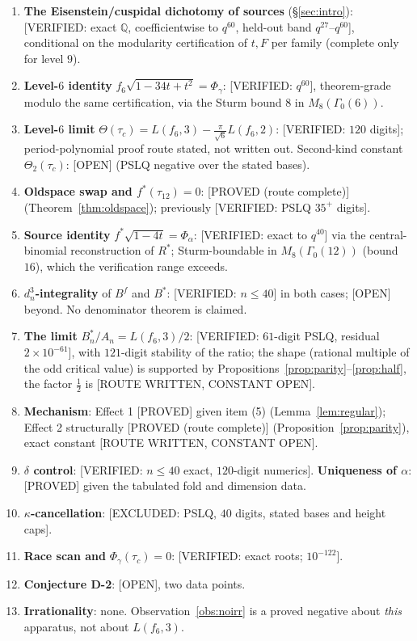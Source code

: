 \documentclass[11pt,reqno]{amsart}
\theoremstyle{plain}
\theoremstyle{definition}
\theoremstyle{remark}
\newcommand{\Q}{\mathbb{Q}}
\newcommand{\fs}{f^{*}}
\newcommand{\Proved}{\textup{\textsf{[PROVED]}}}
\newcommand{\ProvedS}{\textup{\textsf{[PROVED (route complete)]}}}
\newcommand{\VerifiedR}[1]{\textup{\textsf{[VERIFIED: #1]}}}
\newcommand{\ExcludedR}[1]{\textup{\textsf{[EXCLUDED: #1]}}}
\newcommand{\Open}{\textup{\textsf{[OPEN]}}}
\newcommand{\RouteOpen}{\textup{\textsf{[ROUTE WRITTEN, CONSTANT OPEN]}}}
\begin{document}
\begin{enumerate}[leftmargin=2.4em,label=(\arabic*)]
\item \textbf{The Eisenstein/cuspidal dichotomy of sources}
(\S\ref{sec:intro}): \VerifiedR{exact $\Q$, coefficientwise to $q^{60}$,
held-out band $q^{27}$--$q^{60}$}, conditional on the modularity
certification of $t,F$ per family (complete only for level $9$).
\item \textbf{Level-$6$ identity} $f_6\sqrt{1-34t+t^2}=\Phi_\gamma$:
\VerifiedR{$q^{60}$}, theorem-grade modulo the same certification, via the
Sturm bound $8$ in $M_8(\Gamma_0(6))$.
\item \textbf{Level-$6$ limit} $\Theta(\tau_c)=L(f_6,3)-\tfrac\pi{\sqrt6}
L(f_6,2)$: \VerifiedR{$120$ digits}; period-polynomial proof route stated,
not written out. Second-kind constant $\Theta_2(\tau_c)$: \Open{} (PSLQ
negative over the stated bases).
\item \textbf{Oldspace swap and $\fs(\tau_{12})=0$}: \ProvedS{}
(Theorem~\ref{thm:oldspace}); previously \VerifiedR{PSLQ $35^+$ digits}.
\item \textbf{Source identity} $\fs\sqrt{1-4t}=\Phi_\alpha$:
\VerifiedR{exact to $q^{40}$} via the central-binomial reconstruction of
$R^*$; Sturm-boundable in $M_8(\Gamma_0(12))$ (bound $16$), which the
verification range exceeds.
\item \textbf{$d_n^3$-integrality} of $B^f$ and $B^*$: \VerifiedR{$n\le40$}
in both cases; \Open{} beyond. No denominator theorem is claimed.
\item \textbf{The limit} $B^*_n/A_n=L(f_6,3)/2$: \VerifiedR{$61$-digit
PSLQ, residual $2\times10^{-61}$}, with $121$-digit stability of the ratio;
the shape (rational multiple of the odd critical value) is supported by
Propositions~\ref{prop:parity}--\ref{prop:half}, the factor $\tfrac12$ is
\RouteOpen.
\item \textbf{Mechanism}: Effect 1 \Proved{} given item (5)
(Lemma~\ref{lem:regular}); Effect 2 structurally \ProvedS{}
(Proposition~\ref{prop:parity}), exact constant \RouteOpen.
\item \textbf{$\delta$ control}: \VerifiedR{$n\le40$ exact, $120$-digit
numerics}. \textbf{Uniqueness of $\alpha$}: \Proved{} given the tabulated
fold and dimension data.
\item \textbf{$\kappa$-cancellation}: \ExcludedR{PSLQ, $40$ digits, stated
bases and height caps}.
\item \textbf{Race scan and} $\Phi_\gamma(\tau_c)=0$:
\VerifiedR{exact roots; $10^{-122}$}.
\item \textbf{Conjecture D-2}: \Open, two data points.
\item \textbf{Irrationality}: none. Observation~\ref{obs:noirr} is a
proved negative about \emph{this} apparatus, not about $L(f_6,3)$.
\end{enumerate}
\end{document}
